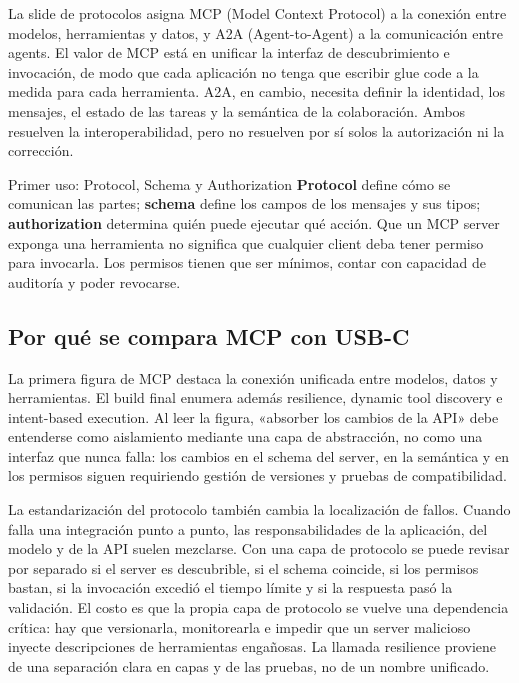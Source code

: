La slide de protocolos asigna MCP (Model Context Protocol) a la conexión entre modelos, herramientas y datos, y A2A (Agent-to-Agent) a la comunicación entre agents. El valor de MCP está en unificar la interfaz de descubrimiento e invocación, de modo que cada aplicación no tenga que escribir glue code a la medida para cada herramienta. A2A, en cambio, necesita definir la identidad, los mensajes, el estado de las tareas y la semántica de la colaboración. Ambos resuelven la interoperabilidad, pero no resuelven por sí solos la autorización ni la corrección.


\begin{knowledgebox}{Primer uso: Protocol, Schema y Authorization}
\textbf{Protocol} define cómo se comunican las partes; \textbf{schema} define los campos de los mensajes y sus tipos; \textbf{authorization} determina quién puede ejecutar qué acción. Que un MCP server exponga una herramienta no significa que cualquier client deba tener permiso para invocarla. Los permisos tienen que ser mínimos, contar con capacidad de auditoría y poder revocarse.
\end{knowledgebox}

\subsection{Por qué se compara MCP con USB-C}

La primera figura de MCP destaca la conexión unificada entre modelos, datos y herramientas. El build final enumera además resilience, dynamic tool discovery e intent-based execution. Al leer la figura, «absorber los cambios de la API» debe entenderse como aislamiento mediante una capa de abstracción, no como una interfaz que nunca falla: los cambios en el schema del server, en la semántica y en los permisos siguen requiriendo gestión de versiones y pruebas de compatibilidad.



La estandarización del protocolo también cambia la localización de fallos. Cuando falla una integración punto a punto, las responsabilidades de la aplicación, del modelo y de la API suelen mezclarse. Con una capa de protocolo se puede revisar por separado si el server es descubrible, si el schema coincide, si los permisos bastan, si la invocación excedió el tiempo límite y si la respuesta pasó la validación. El costo es que la propia capa de protocolo se vuelve una dependencia crítica: hay que versionarla, monitorearla e impedir que un server malicioso inyecte descripciones de herramientas engañosas. La llamada resilience proviene de una separación clara en capas y de las pruebas, no de un nombre unificado.

